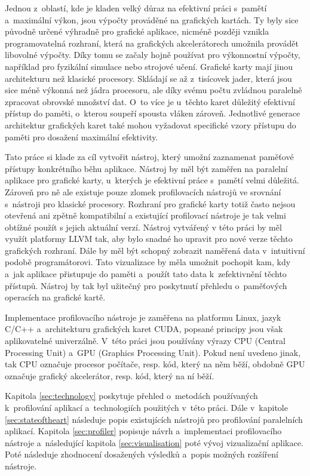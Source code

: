 Jednou z~oblastí, kde je kladen velký důraz na efektivní práci s~pamětí a~maximální výkon, jsou výpočty prováděné na grafických kartách. Ty byly sice původně určené výhradně pro grafické aplikace, nicméně později vznikla programovatelná rozhraní, která na grafických akcelerátorech umožnila provádět libovolné výpočty. Díky tomu se začaly hojně používat pro výkonnostní výpočty, například pro fyzikální simulace nebo strojové učení. Grafické karty mají jinou architekturu než klasické procesory. Skládají se až z~tisícovek jader, která jsou sice méně výkonná než jádra procesoru, ale díky svému počtu zvládnou paralelně zpracovat obrovské množství dat. O~to více je u~těchto karet důležitý efektivní přístup do paměti, o~kterou soupeří spousta vláken zároveň. Jednotlivé generace architektur grafických karet také mohou vyžadovat specifické vzory přístupu do paměti pro dosažení maximální efektivity.

Tato práce si klade za cíl vytvořit nástroj, který umožní zaznamenat paměťové přístupy konkrétního běhu aplikace. Nástroj by měl být zaměřen na paralelní aplikace pro grafické karty, u~kterých je efektivní práce s~pamětí velmi důležitá. Zároveň pro ně ale existuje pouze zlomek profilovacích nástrojů ve srovnání s~nástroji pro klasické procesory. Rozhraní pro grafické karty totiž často nejsou otevřená ani zpětně kompatibilní a existující profilovací nástroje je tak velmi obtížné použít s jejich aktuální verzí. Nástroj vytvářený v této práci by měl využít platformy LLVM tak, aby bylo snadné ho upravit pro nové verze těchto grafických rozhraní. Dále by měl být schopný zobrazit naměřená data v~intuitivní podobě programátorovi. Tato vizualizace by měla umožnit pochopit kam, kdy a~jak aplikace přistupuje do paměti a~použít tato data k~zefektivnění těchto přístupů. Nástroj by tak byl užitečný pro poskytnutí přehledu o~paměťových operacích na grafické kartě.

Implementace profilovacího nástroje je zaměřena na platformu Linux, jazyk C/C++ a~architekturu grafických karet CUDA, popsané principy jsou však aplikovatelné univerzálně. V~této práci jsou používány výrazy CPU (Central Processing Unit) a~GPU (Graphics Processing Unit). Pokud není uvedeno jinak, tak CPU označuje procesor počítače, resp. kód, který na něm běží, obdobně GPU označuje grafický akcelerátor, resp. kód, který na ní běží.

Kapitola \ref{sec:technology} poskytuje přehled o~metodách používaných k~profilování aplikací a~technologiích použitých v~této práci. Dále v~kapitole \ref{sec:stateoftheart} následuje popis existujících nástrojů pro profilování paralelních aplikací. Kapitola \ref{sec:profiler} popisuje návrh a~implementaci profilovacího nástroje a~následující kapitola \ref{sec:visualisation} poté vývoj vizualizační aplikace. Poté následuje zhodnocení dosažených výsledků a~popis možných rozšíření nástroje. 
